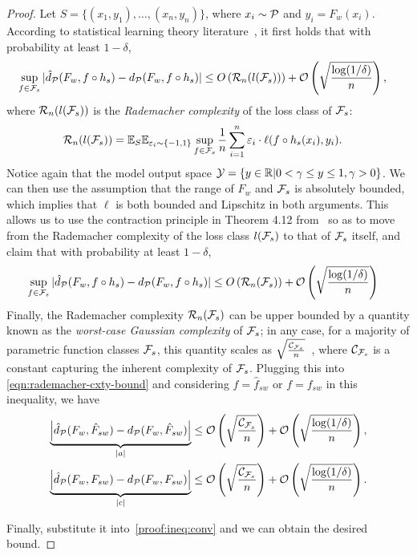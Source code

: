 \begin{proof}
Let $S = \{(x_1,y_1),\dots,(x_n,y_n)\}$, where $x_i \sim \mathcal{P}$ and $y_i = F_w(x_i)$. 
According to statistical learning theory literature~\citep{bartlett2002rademacher}, it first holds that with probability at least $1-\delta$,
\begin{align*}
    \sup_{f \in \mathcal{F}_s} |\hat{d}_{\mathcal{P}}(F_w, f \circ h_s) - d_{\mathcal{P}}(F_w, f \circ h_s)| &\le O \left( \mathcal{R}_n (l(\mathcal{F}_s))\right) + \mathcal{O}\left(\sqrt{\frac{\log(1/\delta)}{n}}\right),
\end{align*}
where $\mathcal{R}_n (l(\mathcal{F}_s))$ is the \textit{Rademacher complexity} of the loss class of $\mathcal{F}_s$:
\begin{align*}
    \mathcal{R}_n (l(\mathcal{F}_s)) &= \mathbb{E}_{S} \mathbb{E}_{\varepsilon_i \sim \{-1,1\}} \sup_{f \in \mathcal{F}_s} \frac{1}{n}\sum_{i=1}^n \varepsilon_i \cdot \ell(f \circ h_s(x_i), y_i).
\end{align*}
Notice again that the model output space $\mathcal{Y} = \{ y \in \mathbb{R}| 0 < \gamma \le y \le 1, \gamma>0 \}$.
We can then use the assumption that the range of $F_w$ and $\mathcal{F}_s$ is absolutely bounded, which implies that $\ell$ is both bounded and Lipschitz in both arguments. 
This allows us to use the contraction principle in Theorem 4.12 from~\citet{ledoux2013probability} so as to move from the Rademacher complexity of the loss class $l(\mathcal{F}_s)$ to that of $\mathcal{F}_s$ itself, and claim that with probability at least $1-\delta$,
\begin{align}
    \sup_{f \in \mathcal{F}_s} |\hat{d}_{\mathcal{P}}(F_w, f \circ h_s) - d_{\mathcal{P}}(F_w, f \circ h_s)| & \le O \left( \mathcal{R}_n (\mathcal{F}_s)\right) + \mathcal{O}\left(\sqrt{\frac{\log(1/\delta)}{n}}\right) \label{eqn:rademacher-cxty-bound}
\end{align}
Finally, the Rademacher complexity $\mathcal{R}_n (\mathcal{F}_s)$ can be upper bounded by a quantity known as the \textit{worst-case Gaussian complexity} of $\mathcal{F}_s$; in any case, for a majority of parametric function classes $\mathcal{F}_s$, this quantity scales as $\sqrt{\frac{\mathcal{C}_{\mathcal{F}_s}}{n}}$~\citep{bartlett2002rademacher}, where $\mathcal{C}_{\mathcal{F}_s}$ is a constant capturing the inherent complexity of $\mathcal{F}_s$. 
Plugging this into \eqref{eqn:rademacher-cxty-bound} and considering $f=\hat{f}_{sw}$ or $f=f_{sw}$ in this inequality, we have
\begin{align*}
    \underbrace{\left| \hat{d}_{\mathcal{P}}(F_w, \hat{F}_{sw}) - d_{\mathcal{P}}(F_w, \hat{F}_{sw}) \right|}_{|a|} \le \mathcal{O}\left(\sqrt{\frac{\mathcal{C}_{\mathcal{F}_s}}{n}}\right) + \mathcal{O}\left(\sqrt{\frac{\log(1/\delta)}{n}}\right), \\
    \underbrace{\left| \hat{d}_{\mathcal{P}}(F_w, F_{sw}) - d_{\mathcal{P}}(F_w, F_{sw}) \right|}_{|c|} \le \mathcal{O}\left(\sqrt{\frac{\mathcal{C}_{\mathcal{F}_s}}{n}}\right) + \mathcal{O}\left(\sqrt{\frac{\log(1/\delta)}{n}}\right).
\end{align*}

Finally, substitute it into~\cref{proof:ineq:conv} and we can obtain the desired bound.
\end{proof}




